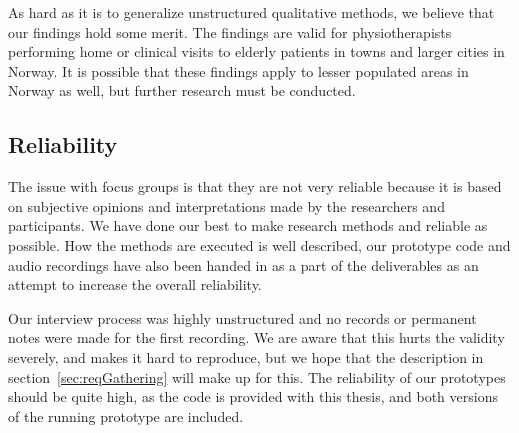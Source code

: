 As hard as it is to generalize unstructured qualitative methods, we believe that our findings hold some merit. The findings are valid for physiotherapists performing home or clinical visits to elderly patients in towns and larger cities in Norway. It is possible that these findings apply to lesser populated areas in Norway as well, but further research must be conducted.

\subsection{Reliability}
The issue with focus groups is that they are not very reliable because it is based on subjective opinions and interpretations made by the researchers and participants. We have done our best to make research methods and reliable as possible. How the methods are executed is well described, our prototype code and audio recordings have also been handed in as a part of the deliverables as an attempt to increase the overall reliability.

Our interview process was highly unstructured and no records or permanent notes were made for the first recording. We are aware that this hurts the validity severely, and makes it hard to reproduce, but we hope that the description in section~\ref{sec:reqGathering} will make up for this. The reliability of our prototypes should be quite high, as the code is provided with this thesis, and both versions of the running prototype are included.
